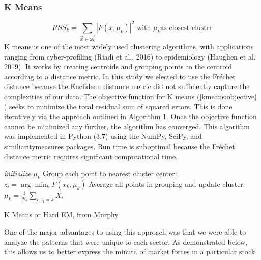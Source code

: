 \documentclass{article}
\begin{document}
\subsubsection{K Means}
\begin{equation}
    \label{kmeans:objective}
    RSS_k = \sum_{\vec{x} \in \vec{\omega_k}}|F(x,\mu_k)|^2\text {   with   } \mu_k \text{as closest cluster}
\end{equation}
K means is one of the most widely used clustering algorithms, with applications ranging from cyber-profiling (Riadi et al., 2016)  to epidemiology (Haughen et al. 2019). It works by creating centroids and grouping points to the centroid according to a distance metric. In this study we elected to use the Fréchet distance because the Euclidean distance metric did not sufficiently capture the complexities of our data. The objective function for K means (\ref{kmeans:objective} ) seeks to minimize the total residual sum of squared errors. This is done iteratively via the approach outlined in Algorithm 1. Once the objective function cannot be minimized any further, the algorithm has converged. This algorithm was implemented in Python (3.7) using the NumPy, SciPy, and similiaritymeasures  packages. Run time is suboptimal because the Fréchet distance metric requires significant computational time.  
\begin{center}
\begin{algorithm}
 \textit{initialize} $\mu_k$ \;
   {Group each point to nearest cluster center: $z_i = \arg \min_k F(x_k,\mu_k)$\;
   Average all points in grouping and update cluster: $\mu_k = \frac{1}{N_k}\sum_{i:z_i = k} X_i$}
  
  \caption{K Means or Hard EM, from Murphy}
\end{algorithm}
\end{center}
One of the major advantages to using this approach was that we were able to analyze the patterns that were unique to each sector. As demonstrated below, this allows us to better express the minuta of market forces in a particular stock. 
\end{document}

